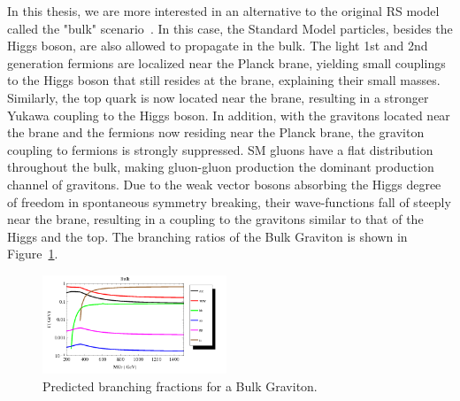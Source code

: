 In this thesis, we are more interested in an alternative to the original RS model called the "bulk" scenario~\cite{PhysRevD.76.036006,Fitzpatrick:2007qr}. In this case, the Standard Model particles, besides the Higgs boson, are also allowed to propagate in the bulk. The light 1st and 2nd generation fermions are localized near the Planck brane, yielding small couplings to the Higgs boson that still resides at the \TeV brane, explaining their small masses. Similarly, the top quark is now located near the \TeV brane, resulting in a stronger Yukawa coupling to the Higgs boson. In addition, with the gravitons located near the \TeV brane and the fermions now residing near the Planck brane, the graviton coupling to fermions is strongly suppressed. SM gluons have a flat distribution throughout the bulk, making gluon-gluon production the dominant production channel of gravitons. Due to the weak vector bosons absorbing the Higgs degree of freedom in spontaneous symmetry breaking, their wave-functions fall of steeply near the \TeV brane, resulting in a coupling to the gravitons similar to that of the Higgs and the top. The branching ratios of the Bulk Graviton is shown in Figure~\ref{fig:theory:bulk}.
\begin{figure}[h!]
\centering
\includegraphics[width=0.49\textwidth]{figures/theory/BulkGravitonBR_tuomas.png}
\caption{Predicted branching fractions for a Bulk Graviton.}
\label{fig:theory:bulk}
\end{figure}

